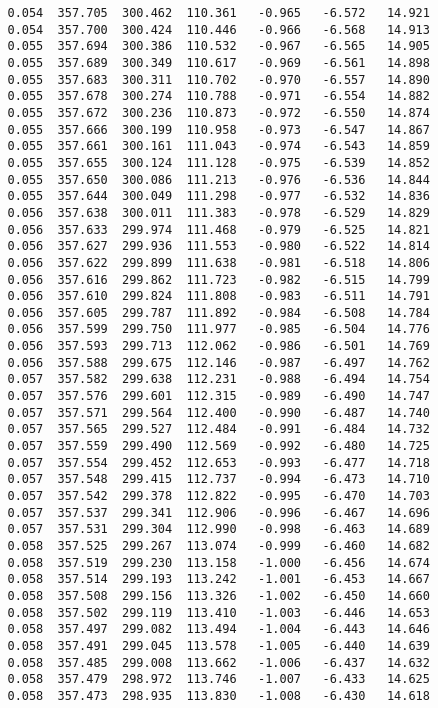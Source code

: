 \begin{verbatim}
   0.054  357.705  300.462  110.361   -0.965   -6.572   14.921
   0.054  357.700  300.424  110.446   -0.966   -6.568   14.913
   0.055  357.694  300.386  110.532   -0.967   -6.565   14.905
   0.055  357.689  300.349  110.617   -0.969   -6.561   14.898
   0.055  357.683  300.311  110.702   -0.970   -6.557   14.890
   0.055  357.678  300.274  110.788   -0.971   -6.554   14.882
   0.055  357.672  300.236  110.873   -0.972   -6.550   14.874
   0.055  357.666  300.199  110.958   -0.973   -6.547   14.867
   0.055  357.661  300.161  111.043   -0.974   -6.543   14.859
   0.055  357.655  300.124  111.128   -0.975   -6.539   14.852
   0.055  357.650  300.086  111.213   -0.976   -6.536   14.844
   0.055  357.644  300.049  111.298   -0.977   -6.532   14.836
   0.056  357.638  300.011  111.383   -0.978   -6.529   14.829
   0.056  357.633  299.974  111.468   -0.979   -6.525   14.821
   0.056  357.627  299.936  111.553   -0.980   -6.522   14.814
   0.056  357.622  299.899  111.638   -0.981   -6.518   14.806
   0.056  357.616  299.862  111.723   -0.982   -6.515   14.799
   0.056  357.610  299.824  111.808   -0.983   -6.511   14.791
   0.056  357.605  299.787  111.892   -0.984   -6.508   14.784
   0.056  357.599  299.750  111.977   -0.985   -6.504   14.776
   0.056  357.593  299.713  112.062   -0.986   -6.501   14.769
   0.056  357.588  299.675  112.146   -0.987   -6.497   14.762
   0.057  357.582  299.638  112.231   -0.988   -6.494   14.754
   0.057  357.576  299.601  112.315   -0.989   -6.490   14.747
   0.057  357.571  299.564  112.400   -0.990   -6.487   14.740
   0.057  357.565  299.527  112.484   -0.991   -6.484   14.732
   0.057  357.559  299.490  112.569   -0.992   -6.480   14.725
   0.057  357.554  299.452  112.653   -0.993   -6.477   14.718
   0.057  357.548  299.415  112.737   -0.994   -6.473   14.710
   0.057  357.542  299.378  112.822   -0.995   -6.470   14.703
   0.057  357.537  299.341  112.906   -0.996   -6.467   14.696
   0.057  357.531  299.304  112.990   -0.998   -6.463   14.689
   0.058  357.525  299.267  113.074   -0.999   -6.460   14.682
   0.058  357.519  299.230  113.158   -1.000   -6.456   14.674
   0.058  357.514  299.193  113.242   -1.001   -6.453   14.667
   0.058  357.508  299.156  113.326   -1.002   -6.450   14.660
   0.058  357.502  299.119  113.410   -1.003   -6.446   14.653
   0.058  357.497  299.082  113.494   -1.004   -6.443   14.646
   0.058  357.491  299.045  113.578   -1.005   -6.440   14.639
   0.058  357.485  299.008  113.662   -1.006   -6.437   14.632
   0.058  357.479  298.972  113.746   -1.007   -6.433   14.625
   0.058  357.473  298.935  113.830   -1.008   -6.430   14.618

\end{verbatim}
